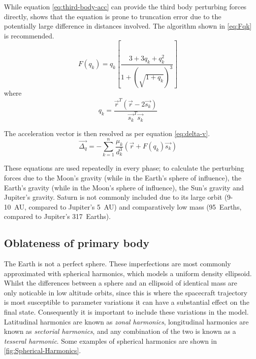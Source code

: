 While equation \eqref{eq:third-body-acc} can provide the third body perturbing forces directly, \textcite{Battin1999} shows that the equation is prone to truncation error due to the potentially large difference in distances involved. The algorithm shown in \eqref{eq:Fqk} is recommended.
\begin{equation} \label{eq:Fqk}
F(q_{k}) = q_{k}\left[ \frac{3+3q_{k}+q_{k}^{2}}{1+(\sqrt{1+q_{k}})^{3}} \right] 
\end{equation} 
where
\begin{equation}
q_{k} = \frac{\vec{r}^{T}(\vec{r}-2\vec{s_{k}})}{\vec{s_{k}}^{T}\vec{s_{k}}}
\end{equation}

The acceleration vector is then resolved as per equation \eqref{eq:delta-v}.
\begin{equation}\label{eq:delta-v}
\vec{\Delta_q} = -\sum_{k=1}^{n}\frac{\mu_{k}}{d_{k}^{3}}(\vec{r}+F(q_{k})\vec{s_{k}})
\end{equation}

These equations are used repeatedly in every phase; to calculate the perturbing forces due to the Moon's gravity (while in the Earth's sphere of influence), the Earth's gravity (while in the Moon's sphere of influence), the Sun's gravity and Jupiter's gravity. Saturn is not commonly included due to its large orbit (9-10~AU, compared to Jupiter's 5~AU) and comparatively low mass (95~Earths, compared to Jupiter's 317~Earths).



\subsection{Oblateness of primary body} \label{sub:Oblateness}

The Earth is not a perfect sphere. These imperfections are most commonly approximated with spherical harmonics, which models a uniform density ellipsoid. Whilst the differences between a sphere and an ellipsoid of identical mass are only noticable in low altitude orbits, since this is where the spacecraft trajectory is most susceptible to parameter variations it can have a substantial effect on the final state. Consequently it is important to include these variations in the model. Latitudinal harmonics are known as \emph{zonal harmonics}, longitudinal harmonics are known as \emph{sectorial harmonics}, and any combination of the two is known as a \emph{tesseral harmonic}. Some examples of spherical harmonics are shown in \autoref{fig:Spherical-Harmonics}.

